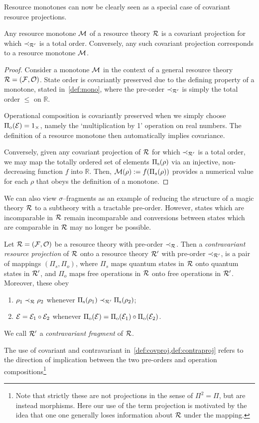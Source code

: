 \documentclass[pra,
aps,
twocolumn,
superscriptaddress,
groupedaddress,
nofootinbib,
reprint
]{revtex4-1}
\begin{document}
Resource monotones can now be clearly seen as a special case of covariant resource projections.
\begin{proposition}\label{thm:monoproj}
	Any resource monotone ${\mathcal M}$ of a resource theory ${\mathcal R}$ is a covariant projection for which $\prec_{{\mathcal R}'}$ is a total order. 
	Conversely, any such covariant projection corresponds to a resource monotone ${\mathcal M}$. 
\end{proposition}
\begin{proof}
	Consider a monotone ${\mathcal M}$ in the context of a general resource theory ${\mathcal R} = ({\mathcal F}, {\mathcal O})$.
	State order is covariantly preserved due to the defining property of a monotone, stated in~\cref{def:mono}, where the pre-order $\prec_{{\mathcal R}'}$ is simply the total order $\leq$ on $\mathbb{R}$. 
	
	Operational composition is covariantly preserved when we simply choose $\Pi_{\rm{o}}({\mathcal E}) = 1_\times$, namely the `multiplication by 1' operation on real numbers. 
	The definition of a resource monotone then automatically implies covariance.
	
	Conversely, given any covariant projection of ${\mathcal R}$ for which $\prec_{{\mathcal R}'}$ is a total order, we may map the totally ordered set of elements $\Pi_{\rm{s}}(\rho)$ via an injective, non-decreasing function $f$ into $\mathbb{R}$. 
	Then, ${\mathcal M}(\rho):=f(\Pi_s(\rho))$ provides a numerical value for each $\rho$ that obeys the definition of a monotone.
	
\end{proof}

We can also view $\sigma$--fragments as an example of reducing the structure of a magic theory ${\mathcal R}$ to a subtheory with a tractable pre-order.
However, states which are incomparable in ${\mathcal R}$ remain incomparable and conversions between states which are comparable in ${\mathcal R}$ may no longer be possible.
\begin{definition}\label{def:contraproj}
	Let ${\mathcal R} = ({\mathcal F}, {\mathcal O})$ be a resource theory with pre-order $\prec_{\mathcal R}$. 
Then a \emph{contravariant resource projection} of ${\mathcal R}$ onto a resource theory ${\mathcal R}'$ with pre-order $\prec_{{\mathcal R}'}$, is a pair of mappings $(\Pi_s, \Pi_o)$, where $\Pi_s$ maps quantum states in ${\mathcal R}$ onto quantum states in ${\mathcal R}'$, and $\Pi_o$ maps free operations in ${\mathcal R}$ onto free operations in ${\mathcal R}'$. 
Moreover, these obey
	\begin{enumerate}
        \item $\rho_1 \prec_{\mathcal R} \rho_2$ whenever $\Pi_{\rm{s}}(\rho_1) \prec_{{\mathcal R}'} \Pi_{\rm{s}}(\rho_2)$;
        \item ${\mathcal E} = {\mathcal E}_1 \circ {\mathcal E}_2$ whenever $\Pi_{\rm{o}}({\mathcal E}) = \Pi_{\rm{o}}({\mathcal E}_1) \circ \Pi_{\rm{o}}({\mathcal E}_2)$.
    \end{enumerate}
We call ${\mathcal R}'$ a \emph{contravariant fragment} of ${\mathcal R}$.
\end{definition}
The use of covariant and contravariant in~\cref{def:covproj,def:contraproj} refers to the direction of implication between the two pre-orders and operation compositions\footnote{Note that strictly these are not projections in the sense of $\Pi^2 = \Pi$, but are instead morphisms. 
Here our use of the term projection is motivated by the idea that one one generally loses information about ${\mathcal R}$ under the mapping.}
\end{document}
